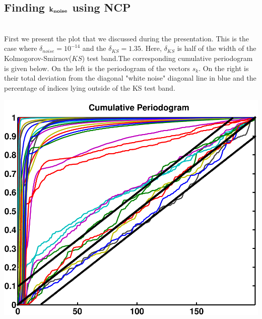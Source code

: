 \documentclass[11pt]{amsart}
\begin{document}
\subsection{Finding $\bf k_{noise}$ using NCP} \indent \\
First we present the plot that we discussed during the presentation. This is the case where
$\delta_{noise} = 10^{-14}$  and the $\delta_{KS}=1.35$. Here, $\delta_{KS}$ is half of the
width of the Kolmogorov-Smirnov($KS$) test band.The corresponding cumulative periodogram is given below. 
On the left is the periodogram of the vectors $s_k$. On the right is their total deviation from 
the diagonal "white noise" diagonal line in blue and the percentage of indices lying outside of the KS test band.



	\vspace{5mm}
	\begin{minipage}[t]{0.5\textwidth}
	
		\includegraphics[width=.95\linewidth]{../presentation/figures/run1/cum_per} 
   
	\end{minipage}
\end{document}
